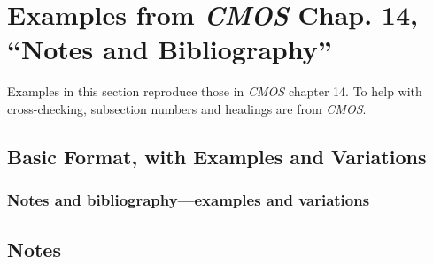 \documentclass[11pt,letterpaper,oneside]{article}
\begin{document}
\section{Examples from \emph{CMOS} Chap. 14, ``Notes and
Bibliography''}
\label{notes}

Examples in this section reproduce those in \textit{CMOS} chapter 14.
To help with cross-checking, subsection numbers and headings are from
\textit{CMOS}.

\subsection{Basic Format, with Examples and Variations}
\setcounter{subsection}{14}

\setcounter{subsubsection}{22}
\subsubsection{Notes and bibliography—examples and variations}
\label{14.23}

\begin{citebib}
\item \cite[87-88]{strayed2012}
\item \cite[261, 265]{strayed2012}
\item \cite[32]{daum2015}
\item \cite[134--35]{daum2015}
\item \cite[188]{grazer2015}
\item \cite[190]{grazer2015}
\item \cite[242--55]{garcia1988}
\item \cite[33]{garcia1988}
\item \cite[310]{gould1984a}
\item \cite[309]{gould1984a}
\item \cite[484--85]{bagley2015}
\item \cite[501]{bagley2015}
\item \cite[311]{liu2015}
\item \cite[312]{liu2015}
\end{citebib}

\setcounter{subsection}{1}
\subsection{Notes}
\setcounter{subsection}{14}
\end{document}
